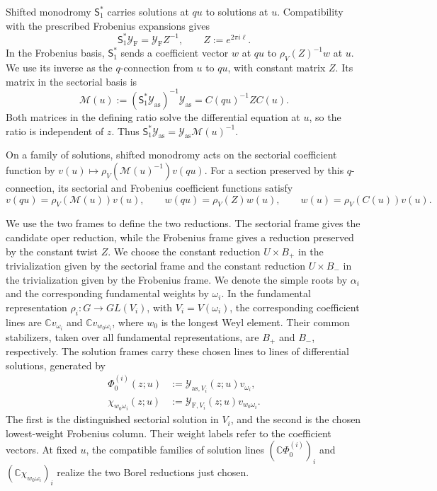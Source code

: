 \documentclass[11pt,leqno]{amsart}
\numberwithin{equation}{section}
\theoremstyle{plain}
\theoremstyle{definition}
\theoremstyle{plain}
\theoremstyle{definition}
\theoremstyle{remark}
\begin{document}
Shifted monodromy $\mathsf S_1^*$ carries solutions at $qu$ to solutions at $u$.  Compatibility with the prescribed Frobenius expansions gives
\[
 \mathsf S_1^*\mathcal Y_{\mathrm F}
 =\mathcal Y_{\mathrm F} Z^{-1},
 \qquad Z:=e^{2\pi i\ell}.
\]
In the Frobenius basis, $\mathsf S_1^*$ sends a coefficient vector $w$ at $qu$ to $\rho_V(Z)^{-1}w$ at $u$.  We use its inverse as the $q$-connection from $u$ to $qu$, with constant matrix $Z$.  Its matrix in the sectorial basis is
\begin{equation}\label{eq:intro-central-q-connection}
 \mathscr M(u)
 :=(\mathsf S_1^*\mathcal Y_{\mathrm{as}})^{-1}\mathcal Y_{\mathrm{as}}
 =C(qu)^{-1}ZC(u).
\end{equation}
Both matrices in the defining ratio solve the differential equation at $u$, so the ratio is independent of $z$.  Thus $\mathsf S_1^*\mathcal Y_{\mathrm{as}}=\mathcal Y_{\mathrm{as}}\mathscr M(u)^{-1}$.

On a family of solutions, shifted monodromy acts on the sectorial coefficient function by $v(u)\mapsto\rho_V(\mathscr M(u)^{-1})v(qu)$.  For a section preserved by this $q$-connection, its sectorial and Frobenius coefficient functions satisfy
\[
 v(qu)=\rho_V(\mathscr M(u))v(u),\qquad
 w(qu)=\rho_V(Z)w(u),\qquad
 w(u)=\rho_V(C(u))v(u).
\]

We use the two frames to define the two reductions.  The sectorial frame gives the candidate oper reduction, while the Frobenius frame gives a reduction preserved by the constant twist $Z$.  We choose the constant reduction $U\times B_+$ in the trivialization given by the sectorial frame and the constant reduction $U\times B_-$ in the trivialization given by the Frobenius frame.  We denote the simple roots by $\alpha_i$ and the corresponding fundamental weights by $\omega_i$.  In the fundamental representation $\rho_i:G\to GL(V_i)$, with $V_i=V(\omega_i)$, the corresponding coefficient lines are $\mathbb Cv_{\omega_i}$ and $\mathbb Cv_{w_0\omega_i}$, where $w_0$ is the longest Weyl element.  Their common stabilizers, taken over all fundamental representations, are $B_+$ and $B_-$, respectively.  The solution frames carry these chosen lines to lines of differential solutions, generated by
\[
 \begin{aligned}
 \Phi_0^{(i)}(z;u)
 &:=\mathcal Y_{\mathrm{as},V_i}(z;u)v_{\omega_i},\\
 \chi_{w_0\omega_i}(z;u)
 &:=\mathcal Y_{\mathrm F,V_i}(z;u)v_{w_0\omega_i}.
 \end{aligned}
\]
The first is the distinguished sectorial solution in $V_i$, and the second is the chosen lowest-weight Frobenius column.  Their weight labels refer to the coefficient vectors.  At fixed $u$, the compatible families of solution lines $(\mathbb C\Phi_0^{(i)})_i$ and $(\mathbb C\chi_{w_0\omega_i})_i$ realize the two Borel reductions just chosen.
\end{document}
